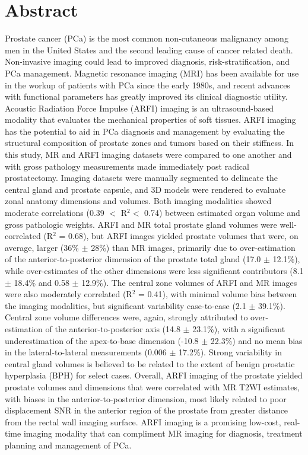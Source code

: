 \section*{Abstract}
Prostate cancer (PCa) is the most common non-cutaneous malignancy among men in
the United States and the second leading cause of cancer related death.
Non-invasive imaging could lead to improved diagnosis, risk-stratification, and
PCa management.  Magnetic resonance imaging (MRI) has been available for use in
the workup of patients with PCa since the early 1980s, and recent advances with
functional parameters has greatly improved its clinical diagnostic utility.
Acoustic Radiation Force Impulse (ARFI) imaging is an ultrasound-based modality
that evaluates the mechanical properties of soft tissues. ARFI imaging has the
potential to aid in PCa diagnosis and management by evaluating the structural
composition of prostate zones and tumors based on their stiffness.  In this
study, MR and ARFI imaging datasets were compared to one another and with gross
pathology measurements made immediately post radical prostatectomy.  Imaging
datasets were manually segmented to delineate the central gland and prostate
capsule, and 3D models were rendered to evaluate zonal anatomy dimensions and
volumes.  Both imaging modalities showed moderate correlations (0.39 $<$ R$^2 <
$ 0.74) between estimated organ volume and gross pathologic weights.  ARFI and MR
total prostate gland volumes were well-correlated (R$^2$ = 0.68), but ARFI
images yielded prostate volumes that were, on average, larger (36\% $\pm$ 28\%)
than MR images, primarily due to over-estimation of the anterior-to-posterior
dimension of the prostate total gland (17.0 $\pm$ 12.1\%), while over-estimates
of the other dimensions were less significant contributors (8.1 $\pm$ 18.4\%
and 0.58 $\pm$ 12.9\%).  The central zone volumes of ARFI and MR images were
also moderately correlated (R$^2$ = 0.41), with minimal volume bias between the
imaging modalities, but significant variability case-to-case (2.1 $\pm$
39.1\%).  Central zone volume differences were, again, strongly attributed to
over-estimation of the anterior-to-posterior axis (14.8 $\pm$ 23.1\%), with a
significant underestimation of the apex-to-base dimension (-10.8 $\pm$ 22.3\%)
and no mean bias in the lateral-to-lateral measurements (0.006 $\pm$ 17.2\%).
Strong variability in central gland volumes is believed to be related to the
extent of benign prostatic hyperplasia (BPH) for select cases.  Overall, ARFI
imaging of the prostate yielded prostate volumes and dimensions that were
correlated with MR T2WI estimates, with biases in the anterior-to-posterior
dimension, most likely related to poor displacement SNR in the anterior region
of the prostate from greater distance from the rectal wall imaging surface.
ARFI imaging is a promising low-cost, real-time imaging modality that can
compliment MR imaging for diagnosis, treatment planning and management of PCa.
